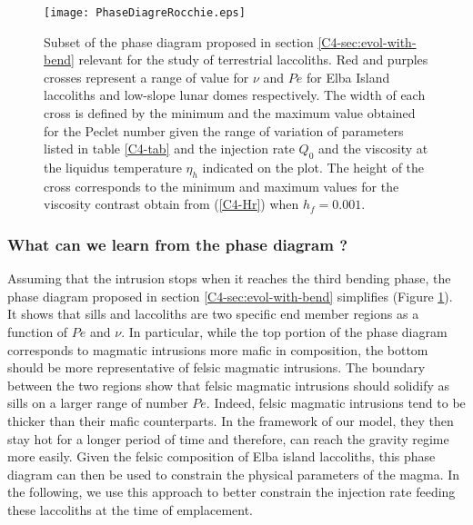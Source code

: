 \begin{figure}[h!]
  \begin{center}
    \graphicspath{ {/Users/thorey/Documents/These/Projet/Refroidissement/Skin_Model/Figure/Figure_Heating/} }
    \texttt{[image: PhaseDiagreRocchie.eps]}
    \caption{Subset  of   the  phase   diagram  proposed   in  section
      \ref{C4-sec:evol-with-bend}   relevant   for    the   study   of
      terrestrial  laccoliths. Red  and  purples  crosses represent  a
      range of value for $\nu$ and $Pe$ for Elba Island laccoliths and
      low-slope lunar domes  respectively. The width of  each cross is
      defined by  the minimum and  the maximum value obtained  for the
      Peclet number given the range  of variation of parameters listed
      in  table \ref{C4-tab}  and  the injection  rate  $Q_0$ and  the
      viscosity at the liquidus  temperature $\eta_h$ indicated on the
      plot. The  height of  the cross corresponds  to the  minimum and
      maximum   values  for   the  viscosity   contrast  obtain   from
      (\ref{C4-Hr}) when $h_f=0.001$.}
    \label{C4-PhaseDiag}
  \end{center}
\end{figure}

\subsubsection*{What can we learn from the phase diagram ?}

Assuming that  the intrusion stops  when it reaches the  third bending
phase,     the      phase     diagram     proposed      in     section
\ref{C4-sec:evol-with-bend}  simplifies  (Figure  \ref{C4-PhaseDiag}).
It shows that sills and laccoliths are two specific end member regions
as a function of $Pe$ and  $\nu$. In particular, while the top portion
of the phase diagram corresponds  to magmatic intrusions more mafic in
composition,  the  bottom  should  be more  representative  of  felsic
magmatic intrusions.  The  boundary between the two  regions show that
felsic magmatic intrusions should solidify  as sills on a larger range
of number $Pe$. Indeed, felsic  magmatic intrusions tend to be thicker
than their  mafic counterparts.  In  the framework of our  model, they
then stay hot  for a longer period of time  and therefore, can reach
the gravity regime more easily.   Given the felsic composition of Elba
island laccoliths,  this phase diagram  can then be used  to constrain
the physical parameters  of the magma.  In the following,  we use this
approach  to  better  constrain   the  injection  rate  feeding  these
laccoliths at the time of emplacement.

